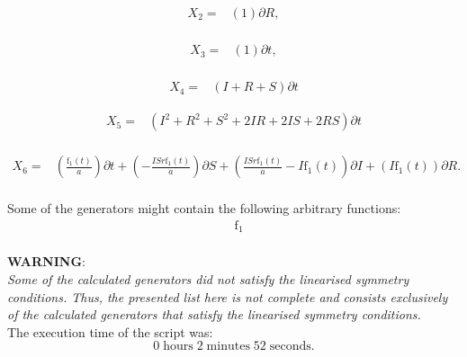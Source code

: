 \begin{align*}
X_{2}=&\left(1 \right)\partial R,\\
\end{align*}

\begin{align*}
X_{3}=&\left(1 \right)\partial t,\\
\end{align*}

\begin{align*}
X_{4}=&\left(I+R+S \right)\partial t
\end{align*}

\begin{align*}
X_{5}=&\left(I^{2}+R^{2}+S^{2}+2 I R+2 I S+2 R S \right)\partial t\\
\end{align*}

\begin{align*}
X_{6}=&\left(\frac{\operatorname{f_{1}}{\left(t \right)}}{a} \right)\partial t+\left(- \frac{I S r \operatorname{f_{1}}{\left(t \right)}}{a} \right)\partial S+\left(\frac{I S r \operatorname{f_{1}}{\left(t \right)}}{a} - I \operatorname{f_{1}}{\left(t \right)} \right)\partial I+\left(I \operatorname{f_{1}}{\left(t \right)} \right)\partial R.\\
\end{align*}



\noindent Some of the generators might contain the following arbitrary functions:
\begin{align*}
&\operatorname{f_{1}}\\
\end{align*}

\noindent\huge\textbf{WARNING}:\\
\noindent\Large\textit{Some of the calculated generators did not satisfy the linearised symmetry conditions. Thus, the presented list here is not complete and consists exclusively of the calculated generators that satisfy the linearised symmetry conditions.}\normalsize\\[2cm]
\noindent The execution time of the script was:
$$0\;\mathrm{hours}\;2\;\mathrm{minutes}\;52 \;\mathrm{seconds}.$$
